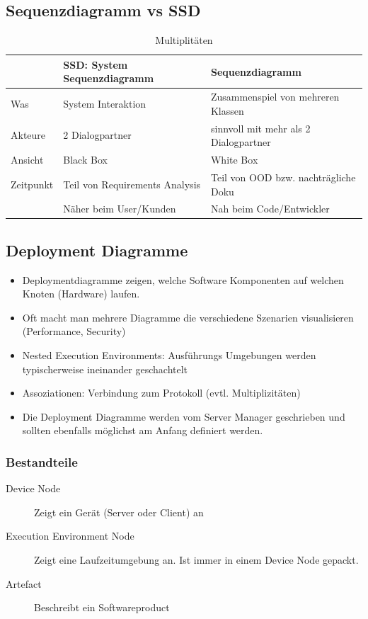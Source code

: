 \subsection{Sequenzdiagramm vs SSD}
\begin{table}[h]
	\centering		
	\begin{tabu} to \linewidth {l X X}
		\toprule
		& SSD: System Sequenzdiagramm & Sequenzdiagramm \\
		\midrule
		Was & System Interaktion & Zusammenspiel von mehreren Klassen \\
		Akteure & 2 Dialogpartner & sinnvoll mit mehr als 2 Dialogpartner \\
		Ansicht & Black Box & White Box\\
		Zeitpunkt & Teil von Requirements Analysis & Teil von OOD bzw. nachträgliche Doku\\
		 & Näher beim User/Kunden & Nah beim Code/Entwickler \\
		\bottomrule
	\end{tabu}
	\caption{Multiplitäten}
\end{table}

\clearpage

\subsection{Deployment Diagramme}
\begin{itemize}
	\item Deploymentdiagramme zeigen, welche Software Komponenten auf welchen Knoten (Hardware) laufen.
	\item Oft macht man mehrere Diagramme die verschiedene Szenarien visualisieren (Performance, Security)
	\item Nested Execution Environments: Ausführungs Umgebungen werden typischerweise ineinander geschachtelt
	\item Assoziationen: Verbindung zum Protokoll (evtl. Multiplizitäten)
	\item Die Deployment Diagramme werden vom Server Manager geschrieben und sollten ebenfalls möglichst am Anfang definiert werden.
\end{itemize}

\subsubsection{Bestandteile}
\begin{description}
	\item[Device Node] Zeigt ein Gerät (Server oder Client) an
	\item[Execution Environment Node] Zeigt eine Laufzeitumgebung an. Ist immer in einem Device Node gepackt.
	\item[Artefact] Beschreibt ein Softwareproduct
\end{description}

